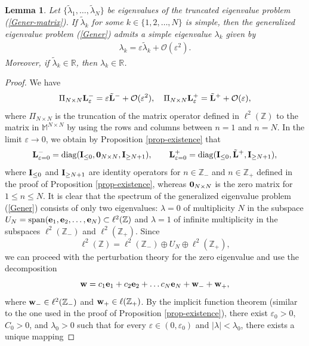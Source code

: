 \documentclass[12pt,reqno]{amsart}
\newtheorem{lemma}{Lemma}
\begin{document}
\begin{lemma}
	\label{theorem-1}
	Let $\{\tilde{\lambda}_1, \dots, \tilde{\lambda}_N \}$ be eigenvalues of the truncated eigenvalue problem  (\ref{Gener-matrix}). If $\tilde{\lambda}_k$ for some $k \in \{1,2,\ldots,N\}$ is simple, then the generalized eigenvalue problem (\ref{Gener}) admits a simple eigenvalue $\lambda_k$ given by 
	\begin{gather}
	\label{eigen-expansion}
	\lambda_k = \varepsilon\tilde{\lambda}_k + \mathcal{O}(\varepsilon^2).
	\end{gather}
Moreover, if $\tilde{\lambda}_k \in \mathbb{R}$, then $\lambda_k \in \mathbb{R}$.
\end{lemma} 

\begin{proof}
We have 
	$$
\Pi_{N \times N} {\bf L}_{\varepsilon}^- = \varepsilon \tilde{\bf L}^- + \mathcal{O}(\varepsilon^2), \quad 	
\Pi_{N \times N} {\bf L}_{\varepsilon}^+ = \tilde{\bf L}^+ + \mathcal{O}(\varepsilon),
	$$
where $\Pi_{N \times N}$ is the truncation of the matrix operator 
defined in $\ell^2(\mathbb{Z})$ to the matrix in $\mathbb{M}^{N \times N}$ 
by using the rows and columns between $n = 1$ and $n = N$. 
In the limit $\varepsilon \to 0$, we obtain by Proposition \ref{prop-existence} that
$$
{\bf L}_{\varepsilon = 0}^- = {\rm diag}({\bf I}_{\leq 0},{\bf 0}_{N \times N},{\bf I}_{\geq N+1}), \qquad {\bf L}_{\varepsilon = 0}^+= {\rm diag}({\bf I}_{\leq 0},\tilde{\bf L}^+,{\bf I}_{\geq N+1}),
$$
where ${\bf I}_{\leq 0}$ and ${\bf I}_{\geq N+1}$ are identity operators for $n \in \mathbb{Z}_-$ and $n \in \mathbb{Z}_+$ defined in the proof of Proposition \ref{prop-existence}, whereas ${\bf 0}_{N \times N}$ is the zero matrix for $1 \leq n \leq N$. It is clear that the spectrum of the generalized eigenvalue 
problem (\ref{Gener}) consists of only two eigenvalues: $\lambda = 0$ of multiplicity $N$ in the subspace $U_N = {\rm span}({\bf e}_1,{\bf e}_2,\dots,{\bf e}_N) \subset \ell^2(\mathbb{Z})$ and 
$\lambda = 1$ of infinite multiplicity in the subspaces 
$\ell^2(\mathbb{Z}_-)$ and $\ell^2(\mathbb{Z}_+)$. Since 
$$
\ell^2(\mathbb{Z}) = \ell^2(\mathbb{Z}_-) \oplus U_N \oplus \ell^2(\mathbb{Z}_+),
$$
we can proceed with the perturbation theory for the zero eigenvalue and use the decomposition 
$$
{\bf w} = c_1 {\bf e}_1 + c_2 {\bf e}_2 + \dots c_N {\bf e}_N + {\bf w}_- + {\bf w}_+, 
$$
where ${\bf w}_- \in \ell^2(\mathbb{Z}_-)$ and ${\bf w}_+ \in \ell(\mathbb{Z}_+)$. By the implicit function theorem (similar to the one used in the proof of Proposition \ref{prop-existence}), there exist $\varepsilon_0 > 0$, $C_0 > 0$, and $\lambda_0 > 0$ such that for every $\varepsilon \in (0,\varepsilon_0)$ and $|\lambda| < \lambda_0$, there exists a unique mapping 

\end{proof}
\end{document}
